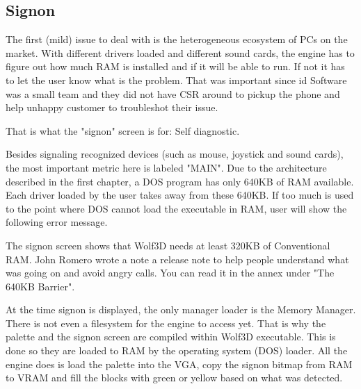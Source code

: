 \documentclass[book.tex]{subfiles}
\begin{document}
\subsection{Signon}
The first (mild) issue to deal with is the heterogeneous ecosystem of PCs on the market. With different drivers loaded and different sound cards, the engine has to figure out how much RAM is installed and if it will be able to run. If not it has to let the user know what is the problem. That was important since id Software was a small team and they did not have CSR around to pickup the phone and help unhappy customer to troubleshot their issue.\\
\par
That is what the "signon" screen is for: Self diagnostic. 
\par
\begin{figure}[H]
\centering
{}
\end{figure}
\par
Besides signaling recognized devices (such as mouse, joystick and sound cards), the most important metric here is labeled "MAIN". Due to the architecture described in the first chapter, a DOS program has only 640KB of RAM available. Each driver loaded by the user takes away from these 640KB. If too much is used to the point where DOS cannot load the executable in RAM, user will show the following error message.\\
\par 
\begin{minipage}{\textwidth}

\end{minipage}
\par
The signon screen shows that Wolf3D needs at least 320KB of Conventional RAM. John Romero wrote a note a release note to help people understand what was going on and avoid angry calls. You can read it in the annex under "The 640KB Barrier".\\
\par 
At the time signon is displayed, the only manager loader is the Memory Manager. There is not even a filesystem for the engine to access yet. That is why the palette and the signon screen are compiled within Wolf3D executable. This is done so they are loaded to RAM by the operating system (DOS) loader. All the engine does is load the palette into the VGA, copy the signon bitmap from RAM to VRAM and fill the blocks with green or yellow based on what was detected.\\
\par
\end{document}
